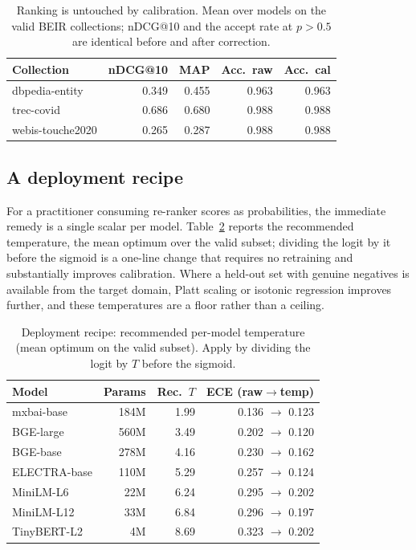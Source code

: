 \documentclass[sigconf,nonacm]{acmart}
\newcommand{\thead}[1]{\textbf{#1}}
\begin{document}
\begin{table}[t]
\centering
\caption{Ranking is untouched by calibration. Mean over models on the valid BEIR
collections; nDCG@10 and the accept rate at $p{>}0.5$ are identical before and after
correction.}\label{tab:downstream}
\small
\begin{tabular}{lrrrr}
\toprule
\thead{Collection} & \thead{nDCG@10} & \thead{MAP} & \thead{Acc.\ raw} & \thead{Acc.\ cal} \\
\midrule
dbpedia-entity   & 0.349 & 0.455 & 0.963 & 0.963 \\
trec-covid       & 0.686 & 0.680 & 0.988 & 0.988 \\
webis-touche2020 & 0.265 & 0.287 & 0.988 & 0.988 \\
\bottomrule
\end{tabular}
\end{table}

\subsection{A deployment recipe}
For a practitioner consuming re-ranker scores as probabilities, the immediate remedy
is a single scalar per model. Table~\ref{tab:recipe} reports the recommended
temperature, the mean optimum over the valid subset; dividing the logit by it before
the sigmoid is a one-line change that requires no retraining and substantially
improves calibration. Where a held-out set with genuine negatives is available from
the target domain, Platt scaling or isotonic regression improves further, and these
temperatures are a floor rather than a ceiling.

\begin{table}[t]
\centering
\caption{Deployment recipe: recommended per-model temperature (mean optimum on the
valid subset). Apply by dividing the logit by $T$ before the sigmoid.}\label{tab:recipe}
\small
\setlength{\tabcolsep}{4.5pt}
\begin{tabular}{lrrr}
\toprule
\thead{Model} & \thead{Params} & \thead{Rec.\ $T$} & \thead{ECE (raw$\to$temp)} \\
\midrule
mxbai-base   & 184M & 1.99 & 0.136 $\to$ 0.123 \\
BGE-large    & 560M & 3.49 & 0.202 $\to$ 0.120 \\
BGE-base     & 278M & 4.16 & 0.230 $\to$ 0.162 \\
ELECTRA-base & 110M & 5.29 & 0.257 $\to$ 0.124 \\
MiniLM-L6    & 22M  & 6.24 & 0.295 $\to$ 0.202 \\
MiniLM-L12   & 33M  & 6.84 & 0.296 $\to$ 0.197 \\
TinyBERT-L2  & 4M   & 8.69 & 0.323 $\to$ 0.202 \\
\bottomrule
\end{tabular}
\end{table}
\end{document}
